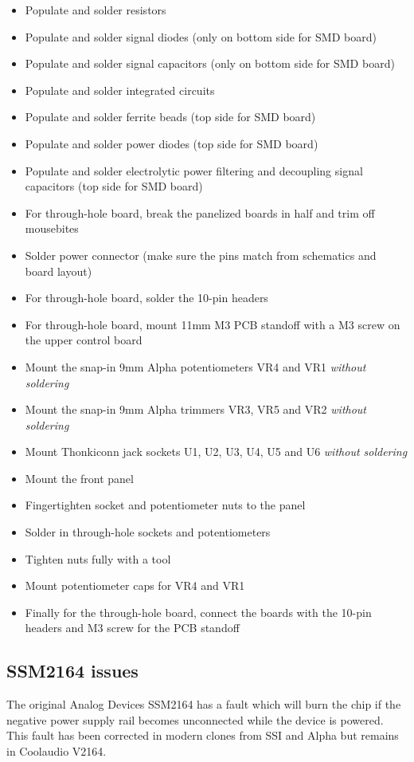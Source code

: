 \documentclass{article}
\begin{document}
\begin{itemize}
\item Populate and solder resistors
\item Populate and solder signal diodes (only on bottom side for SMD board)
\item Populate and solder signal capacitors (only on bottom side for SMD board)
\item Populate and solder integrated circuits
\item Populate and solder ferrite beads (top side for SMD board)
\item Populate and solder power diodes (top side for SMD board)
\item Populate and solder electrolytic power filtering and decoupling signal capacitors (top side for SMD board)
\item For through-hole board, break the panelized boards in half and trim off mousebites
\item Solder power connector (make sure the pins match from schematics and board layout)
\item For through-hole board, solder the 10-pin headers
\item For through-hole board, mount 11mm M3 PCB standoff with a M3 screw on the upper control board
\item Mount the snap-in 9mm Alpha potentiometers VR4 and VR1 \emph{without soldering}
\item Mount the snap-in 9mm Alpha trimmers VR3, VR5 and VR2 \emph{without soldering}
\item Mount Thonkiconn jack sockets U1, U2, U3, U4, U5 and U6 \emph{without soldering}
\item Mount the front panel
\item Fingertighten socket and potentiometer nuts to the panel
\item Solder in through-hole sockets and potentiometers
\item Tighten nuts fully with a tool
\item Mount potentiometer caps for VR4 and VR1
\item Finally for the through-hole board, connect the boards with the 10-pin headers and M3 screw for the PCB standoff
\end{itemize}

\subsection{SSM2164 issues}
The original Analog Devices SSM2164 has a fault which will burn the chip if the negative power supply rail becomes unconnected while the device is powered. This fault has been corrected in modern clones from SSI and Alpha but remains in Coolaudio V2164.\newline
\end{document}
